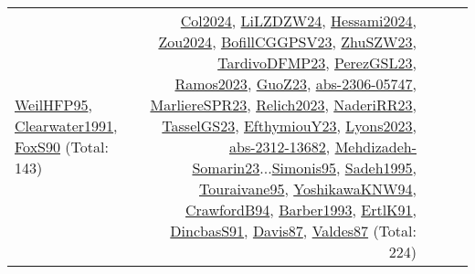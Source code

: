 {\begin{longtable}{p{3cm}r>{\raggedright\arraybackslash}p{6cm}>{\raggedright\arraybackslash}p{6cm}>{\raggedright\arraybackslash}p{8cm}}
\hyperref[detail:WeilHFP95]{WeilHFP95}, \hyperref[detail:Clearwater1991]{Clearwater1991}, \hyperref[detail:FoxS90]{FoxS90} (Total: 143) & \hyperref[detail:Col2024]{Col2024}, \hyperref[detail:LiLZDZW24]{LiLZDZW24}, \hyperref[detail:Hessami2024]{Hessami2024}, \hyperref[detail:Zou2024]{Zou2024}, \hyperref[detail:BofillCGGPSV23]{BofillCGGPSV23}, \hyperref[detail:ZhuSZW23]{ZhuSZW23}, \hyperref[detail:TardivoDFMP23]{TardivoDFMP23}, \hyperref[detail:PerezGSL23]{PerezGSL23}, \hyperref[detail:Ramos2023]{Ramos2023}, \hyperref[detail:GuoZ23]{GuoZ23}, \hyperref[detail:abs-2306-05747]{abs-2306-05747}, \hyperref[detail:MarliereSPR23]{MarliereSPR23}, \hyperref[detail:Relich2023]{Relich2023}, \hyperref[detail:NaderiRR23]{NaderiRR23}, \hyperref[detail:TasselGS23]{TasselGS23}, \hyperref[detail:EfthymiouY23]{EfthymiouY23}, \hyperref[detail:Lyons2023]{Lyons2023}, \hyperref[detail:abs-2312-13682]{abs-2312-13682}, \hyperref[detail:Mehdizadeh-Somarin23]{Mehdizadeh-Somarin23}...\hyperref[detail:Simonis95]{Simonis95}, \hyperref[detail:Sadeh1995]{Sadeh1995}, \hyperref[detail:Touraivane95]{Touraivane95}, \hyperref[detail:YoshikawaKNW94]{YoshikawaKNW94}, \hyperref[detail:CrawfordB94]{CrawfordB94}, \hyperref[detail:Barber1993]{Barber1993}, \hyperref[detail:ErtlK91]{ErtlK91}, \hyperref[detail:DincbasS91]{DincbasS91}, \hyperref[detail:Davis87]{Davis87}, \hyperref[detail:Valdes87]{Valdes87} (Total: 224)\\
\end{longtable}
}

\clearpage
